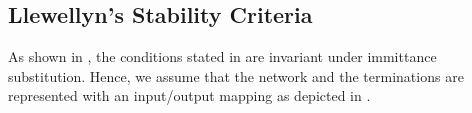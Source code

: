 \subsection{Llewellyn's Stability Criteria}\label{sec:ana:llewellyn}
%

As shown in \cite{rollett}, the conditions stated in  are invariant under
immittance substitution. Hence, we assume that the network and the terminations are represented
with an input/output mapping as depicted in  .

